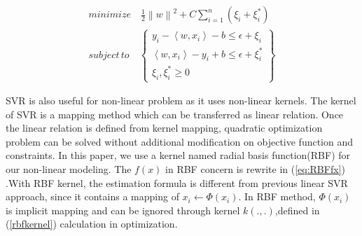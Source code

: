 \documentclass[conference]{IEEEtran}
\begin{document}
% 


\begin{equation}
\begin{split}
\label{eq:liopti}
minimize\quad \frac{1}{2}\left \| w \right \|^{2}+C\sum_{i=1}^{n}(\xi_{i} +
\xi_i^* ) 
\\ subject \, to \quad 
\begin{Bmatrix} 
y_i-\left \langle w,x_i \right
\rangle -b\leq \epsilon+\xi _i \\ \left \langle w,x_i \right \rangle - y_i+b\leq \epsilon+\xi _i^*
\\ \xi _i,\xi _i^*\geq 0
\end{Bmatrix}
\end{split}
\end{equation}


SVR is also useful for non-linear problem as it uses non-linear kernels. The
kernel of SVR is a mapping method which can be transferred as linear relation.
Once the linear relation is defined from kernel mapping, quadratic optimization
problem can be solved without additional modification on objective function and
constraints. In this paper, we use a kernel named radial basis
function(RBF) for our non-linear modeling. The $f(x)$ in RBF concern is
rewrite in (\ref{eq:RBFfx}) .With RBF kernel, the estimation formula
is different from previous linear SVR approach, since it contains a mapping of $x_{i} \leftarrow
\Phi(x_{i})$. In RBF method, $\Phi(x_{i})$ is implicit mapping and can be
ignored through kernel $k(.,.)$,defined in (\ref{rbfkernel}) calculation in
optimization.
\end{document}
